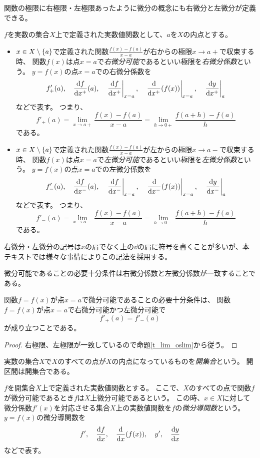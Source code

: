 関数の極限に右極限・左極限あったように微分の概念にも右微分と左微分が定義できる。

\begin{definition}[片側微分]
$f$を実数の集合$X$上で定義された実数値関数として、$a$を$X$の内点とする。
\begin{itemize}
\item
$x \in X\setminus\{a\}$で定義された関数$\frac{f(x)-f(a)}{x-a}$が右からの極限$x \to a+$で収束する時、
関数$f(x)$は点$x = a$で\emph{右微分可能}であるといい極限を\emph{右微分係数}という。
$y = f(x)$の点$x = a$での右微分係数を
$$
f'_+(a), \quad \dv{f}{x^+}{(a)}, \quad \eval{\dv{f}{x^+}}_{x = a}, \quad \eval{\dv{x^+}(f(x))}_{x = a}, \quad \eval{\dv{y}{x^+}}_a
$$
などで表す。
つまり、
$$
f'_+(a) = \lim_{x \to a+}\frac{f(x)-f(a)}{x-a} = \lim_{h \to 0+}\frac{f(a+h)-f(a)}{h}
$$
である。
\item
$x \in X\setminus\{a\}$で定義された関数$\frac{f(x)-f(a)}{x-a}$が左からの極限$x \to a-$で収束する時、
関数$f(x)$は点$x = a$で\emph{左微分可能}であるといい極限を\emph{左微分係数}という。
$y = f(x)$の点$x = a$での左微分係数を
$$
f'_-(a), \quad \dv{f}{x^-}{(a)}, \quad \eval{\dv{f}{x^-}}_{x = a}, \quad \eval{\dv{x^-}(f(x))}_{x = a}, \quad \eval{\dv{y}{x^-}}_a
$$
などで表す。
つまり、
$$
f'_-(a) = \lim_{x \to a-}\frac{f(x)-f(a)}{x-a} = \lim_{h \to 0-}\frac{f(a+h)-f(a)}{h}
$$
である。
\end{itemize}
\end{definition}

右微分・左微分の記号は$x$の肩でなく上の$\dd$の肩に符号を書くことが多いが、本テキストでは様々な事情によりこの記法を採用する。

微分可能であることの必要十分条件は右微分係数と左微分係数が一致することである。

\begin{proposition}
\label{t_semidiff}
関数$f = f(x)$が点$x = a$で微分可能であることの必要十分条件は、
関数$f = f(x)$が点$x = a$で右微分可能かつ左微分可能で
$$
f'_+(a) = f'_-(a)
$$
が成り立つことである。
\end{proposition}

\begin{proof}
右極限、左極限が一致しているので命題\ref{t_lim_oslim}から従う。
\end{proof}

実数の集合$X$で$X$のすべての点が$X$の内点になっているものを\emph{開集合}という。
開区間は開集合である。

\begin{definition}[微分導関数]
$f$を開集合$X$上で定義された実数値関数とする。
ここで、$X$のすべての点で関数$f$が微分可能であるとき$f$は$X$上微分可能であるという。
この時、$x \in X$に対して微分係数$f'(x)$を対応させる集合$X$上の実数値関数を$f$の\emph{微分導関数}という。
$y = f(x)$の微分導関数を
$$
f', \quad \dv{f}{x}, \quad \dv{x}(f(x)), \quad y', \quad \dv{y}{x}
$$
などで表す。
\end{definition}

